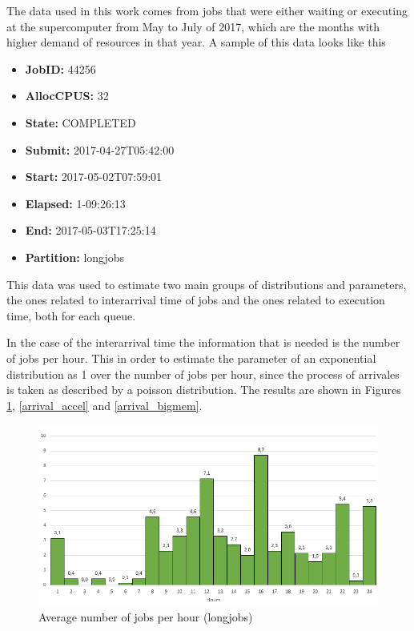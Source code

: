 \documentclass{wscpaperproc}
\begin{document}
The data used in this work comes from jobs that were either waiting or executing
at the supercomputer from May to July of 2017, which are the months with higher
demand of resources in that year. A sample of this data looks like
this

\begin{itemize}
    \item \textbf{JobID:} 44256
    \item \textbf{AllocCPUS:} 32
    \item \textbf{State:} COMPLETED
    \item \textbf{Submit:} 2017-04-27T05:42:00
    \item \textbf{Start:} 2017-05-02T07:59:01
    \item \textbf{Elapsed:} 1-09:26:13
    \item \textbf{End:} 2017-05-03T17:25:14
    \item \textbf{Partition:} longjobs
\end{itemize}

This data was used to estimate two main groups of distributions and parameters,
the ones related to interarrival time of jobs and the ones related to execution
time, both for each queue.

In the case of the interarrival time the information that is needed is the
number of jobs per hour. This in order to estimate the parameter of an
exponential distribution as 1 over the number of jobs per hour, since the
process of arrivales is taken as described by a poisson distribution.
The results are shown in Figures \ref{arrival_longjobs}, \ref{arrival_accel} and
\ref{arrival_bigmem}.

\begin{figure}[h!]
\includegraphics[width=\textwidth]{./images/average_arrivals_longjobs}
\caption{Average number of jobs per hour (longjobs)}
\label{arrival_longjobs}
\end{figure}
\end{document}

